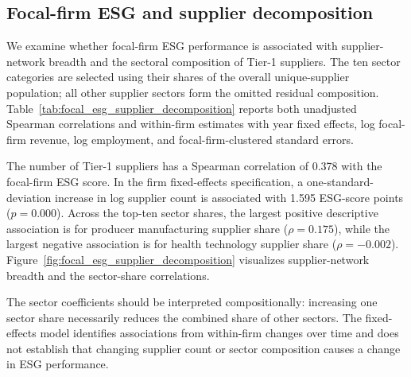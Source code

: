 \subsection{Focal-firm ESG and supplier decomposition}
\label{sec:focal_esg_supplier_decomposition}

We examine whether focal-firm ESG performance is associated with supplier-network breadth and the sectoral composition of Tier-1 suppliers. The ten sector categories are selected using their shares of the overall unique-supplier population; all other supplier sectors form the omitted residual composition. Table~\ref{tab:focal_esg_supplier_decomposition} reports both unadjusted Spearman correlations and within-firm estimates with year fixed effects, log focal-firm revenue, log employment, and focal-firm-clustered standard errors.

The number of Tier-1 suppliers has a Spearman correlation of 0.378 with the focal-firm ESG score. In the firm fixed-effects specification, a one-standard-deviation increase in log supplier count is associated with 1.595 ESG-score points ($p=0.000$). Across the top-ten sector shares, the largest positive descriptive association is for producer manufacturing supplier share ($\rho=0.175$), while the largest negative association is for health technology supplier share ($\rho=-0.002$). Figure~\ref{fig:focal_esg_supplier_decomposition} visualizes supplier-network breadth and the sector-share correlations.

The sector coefficients should be interpreted compositionally: increasing one sector share necessarily reduces the combined share of other sectors. The fixed-effects model identifies associations from within-firm changes over time and does not establish that changing supplier count or sector composition causes a change in ESG performance.

